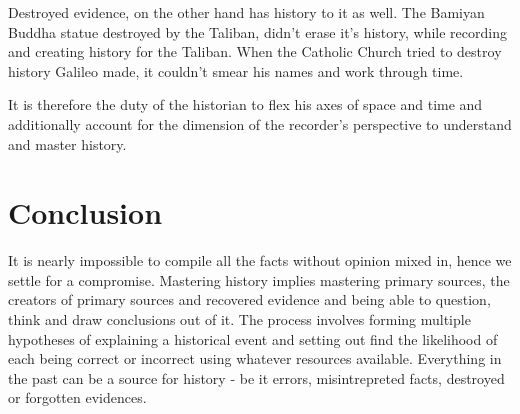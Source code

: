 \documentclass[a4paper]{article}
\begin{document}
Destroyed evidence, on the other hand has history to it as well. The
Bamiyan Buddha statue destroyed by the Taliban, didn't erase it's
history, while recording and creating history for the Taliban. When the
Catholic Church tried to destroy history Galileo made, it couldn't smear
his names and work through time.

It is therefore the duty of the historian to flex his axes of space and
time and additionally account for the dimension of the recorder's
perspective to understand and master history.

\section{Conclusion}

It is nearly impossible to compile all the facts without opinion mixed
in, hence we settle for a compromise.  Mastering history implies
mastering primary sources, the creators of primary sources and recovered
evidence and being able to question, think and draw conclusions out of
it.  The process involves forming multiple hypotheses of explaining a
historical event and setting out find the likelihood of each being
correct or incorrect using whatever resources available. Everything in
the past can be a source for history - be it errors, misintrepreted
facts, destroyed or forgotten evidences. 

\printbibliography 
\end{document}
